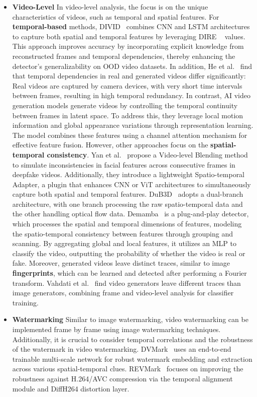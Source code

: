 \begin{itemize}
    \item \textbf{Video-Level}
    In video-level analysis, the focus is on the unique characteristics of videos, such as temporal and spatial features. 
    For \textbf{temporal-based} methods, DIVID~\cite{liu2024turns} combines CNN and LSTM architectures to capture both spatial and temporal features by leveraging DIRE ~\cite{wang2023dire} values. This approach improves accuracy by incorporating explicit knowledge from reconstructed frames and temporal dependencies, thereby enhancing the detector's generalizability on OOD video datasets. In addition, He et al.~\cite{he2024exposing} find that temporal dependencies in real and generated videos differ significantly: Real videos are captured by camera devices, with very short time intervals between frames, resulting in high temporal redundancy. In contrast, AI video generation models generate videos by controlling the temporal continuity between frames in latent space. To address this, they leverage local motion information and global appearance variations through representation learning. The model combines these features using a channel attention mechanism for effective feature fusion.
    However, other approaches focus on the \textbf{spatial-temporal consistency}. 
    Yan et al.~\cite{yan2024generalizing} propose a Video-level Blending method to simulate inconsistencies in facial features across consecutive frames in deepfake videos. Additionally, they introduce a lightweight Spatio-temporal Adapter, a plugin that enhances CNN or ViT architectures to simultaneously capture both spatial and temporal features.
    DuB3D~\cite{ji2024distinguish} adopts a dual-branch architecture, with one branch processing the raw spatio-temporal data and the other handling optical flow data.
    Demamba~\cite{chen2024demamba} is a plug-and-play detector, which processes the spatial and temporal dimensions of features, modeling the spatio-temporal consistency between features through grouping and scanning. By aggregating global and local features, it utilizes an MLP to classify the video, outputting the probability of whether the video is real or fake.
    Moreover, generated videos leave distinct traces, similar to image \textbf{fingerprints}, which can be learned and detected after performing a Fourier transform. Vahdati et al.~\cite{vahdati2024beyond} find video generators leave different traces than image generators, combining frame and video-level analysis for classifier training.

    \item \textbf{Watermarking}
    Similar to image watermarking, video watermarking can be implemented frame by frame using image watermarking techniques. Additionally, it is crucial to consider temporal correlations and the robustness of the watermark in video watermarking. DVMark~\cite{luo2023dvmark} uses an end-to-end trainable multi-scale network for robust watermark embedding and extraction across various spatial-temporal clues. REVMark~\cite{zhang2023novel} focuses on improving the robustness against H.264/AVC compression via the temporal alignment module and DiffH264 distortion layer.
    \end{itemize}

